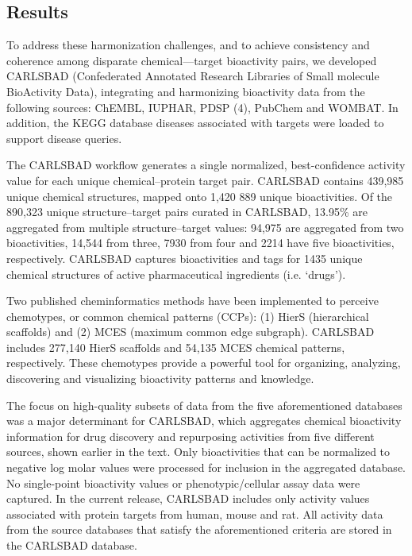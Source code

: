 \subsection{Results}

To address these harmonization challenges, and to achieve consistency and coherence among disparate chemical—target bioactivity pairs, we developed CARLSBAD (Confederated Annotated Research Libraries of Small molecule BioActivity Data), integrating and harmonizing bioactivity data from the following sources: ChEMBL\cite{Gaulton2017-gp}, IUPHAR\cite{Harding2018-ut}, PDSP\cite{Roth2000-bh} (4), PubChem\cite{Kim2021-dv} and WOMBAT\cite{Olah2005-zd}. In addition, the KEGG database\cite{Ogata1999-he} diseases associated with targets were loaded to support disease queries.

The CARLSBAD workflow generates a single normalized, best-confidence activity value for each unique chemical–protein target pair. CARLSBAD contains 439,985 unique chemical structures, mapped onto 1,420 889 unique bioactivities. Of the 890,323 unique structure–target pairs curated in CARLSBAD, 13.95\% are aggregated from multiple structure–target values: 94,975 are aggregated from two bioactivities, 14,544 from three, 7930 from four and 2214 have five bioactivities, respectively.  CARLSBAD captures bioactivities and tags for 1435 unique chemical structures of active pharmaceutical ingredients (i.e. ‘drugs’). 

Two published cheminformatics methods have been implemented to perceive chemotypes, or common chemical patterns (CCPs): (1) HierS (hierarchical scaffolds) and (2) MCES (maximum common edge subgraph). CARLSBAD includes 277,140 HierS scaffolds and 54,135 MCES chemical patterns, respectively. These chemotypes provide a powerful tool for organizing, analyzing, discovering and visualizing bioactivity patterns and knowledge.

The focus on high-quality subsets of data from the five aforementioned databases was a major determinant for CARLSBAD, which aggregates chemical bioactivity information for drug discovery and repurposing activities from five different sources, shown earlier in the text. Only bioactivities that can be normalized to negative log molar values were processed for inclusion in the aggregated database. No single-point bioactivity values or phenotypic/cellular assay data were captured. In the current release, CARLSBAD includes only activity values associated with protein targets from human, mouse and rat. All activity data from the source databases that satisfy the aforementioned criteria are stored in the CARLSBAD database.

